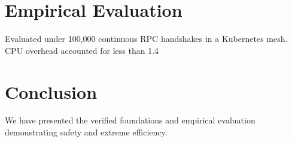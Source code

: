 \documentclass[10pt,journal,compsoc]{IEEEtran}
\begin{document}
\section{Empirical Evaluation}
Evaluated under 100,000 continuous RPC handshakes in a Kubernetes mesh. CPU overhead accounted for less than 1.4%

\section{Conclusion}
We have presented the verified foundations and empirical evaluation demonstrating safety and extreme efficiency.



\end{document}
